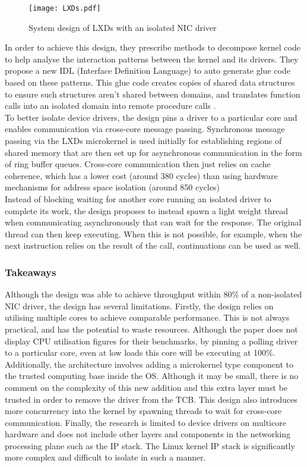 \begin{figure}[h]
  \centering
  \texttt{[image: LXDs.pdf]}
  \caption{System design of LXDs with an isolated NIC driver}
  \label{f:lxds}
\end{figure}

In order to achieve this design, they prescribe methods to decompose kernel code to help analyse the 
interaction patterns between the kernel and its drivers. They propose a new IDL (Interface Definition 
Language) to auto generate glue code based on these patterns. This glue code creates copies
of shared data structures to ensure such structures aren't shared between domains, and translates function calls into 
an isolated domain into remote procedure calls \cite{Narayanan_BJSBQ_19}.\\ 
To better isolate device drivers, the design pins a driver to a particular core and enables communication via cross-core
message passing. Synchronous message passing via the LXDs microkernel is used initially for establishing regions of
shared memory that are then set up for asynchronous communication in the form of ring buffer queues. Cross-core communication
then just relies on cache coherence, which has a lower cost (around 380 cycles) than using hardware mechanisms for
address space isolation (around 850 cycles)\\
Instead of blocking waiting for another core running an isolated driver to complete its work, the design proposes to instead
spawn a light weight thread when communicating asynchronously that can wait for the response. The original thread
can then keep executing. When this is not possible, for example, when the next instruction relies on the result of the call,
continuations can be used as well. 

\subsubsection{Takeaways}
Although the design was able to achieve throughput within 80\% of a non-isolated NIC driver,
the design has several limitations. Firstly, the design relies on utilising multiple cores to achieve comparable
performance. This is not always practical, and has the potential to waste resources. Although the paper does not display
CPU utilisation figures for their benchmarks, by pinning a polling driver to a particular core, even at low loads 
this core will be executing at 100\%. Additionally, the architecture involves adding a microkernel type
component to the trusted computing base inside the OS. Although it may be small, there is no comment on the
complexity of this new addition and this extra layer must be trusted in order to remove the driver from the TCB.
This design also introduces more concurrency into the kernel by spawning threads to wait for cross-core communication.
Finally, the research is limited to device drivers on multicore hardware and does not include other
layers and components in the networking processing plane such as the IP stack. The Linux kernel IP stack is significantly
more complex and difficult to isolate in such a manner.

